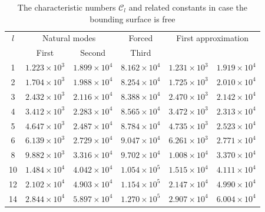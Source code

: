 \begin{table}[ht]
\centering
\caption{The characteristic numbers $\mathcal{C}_l$ and related constants in case the bounding surface is free}
\label{tab:XX}
\begin{tabular}{c c c c c c}
\hline
$l$ & \multicolumn{2}{c}{Natural modes} & Forced & \multicolumn{2}{c}{First approximation} \\
 & First & Second & Third & & \\
\hline
1 & $1.223\times 10^3$ & $1.899\times 10^4$ & $8.162\times 10^4$ & $1.231\times 10^3$ & $1.919\times 10^4$ \\
2 & $1.704\times 10^3$ & $1.988\times 10^4$ & $8.254\times 10^4$ & $1.725\times 10^3$ & $2.010\times 10^4$ \\
3 & $2.432\times 10^3$ & $2.116\times 10^4$ & $8.388\times 10^4$ & $2.470\times 10^3$ & $2.142\times 10^4$ \\
4 & $3.412\times 10^3$ & $2.283\times 10^4$ & $8.565\times 10^4$ & $3.472\times 10^3$ & $2.313\times 10^4$ \\
5 & $4.647\times 10^3$ & $2.487\times 10^4$ & $8.784\times 10^4$ & $4.735\times 10^3$ & $2.523\times 10^4$ \\
6 & $6.139\times 10^3$ & $2.729\times 10^4$ & $9.047\times 10^4$ & $6.261\times 10^3$ & $2.771\times 10^4$ \\
8 & $9.882\times 10^3$ & $3.316\times 10^4$ & $9.702\times 10^4$ & $1.008\times 10^4$ & $3.370\times 10^4$ \\
10 & $1.484\times 10^4$ & $4.042\times 10^4$ & $1.054\times 10^5$ & $1.515\times 10^4$ & $4.111\times 10^4$ \\
12 & $2.102\times 10^4$ & $4.903\times 10^4$ & $1.154\times 10^5$ & $2.147\times 10^4$ & $4.990\times 10^4$ \\
14 & $2.844\times 10^4$ & $5.897\times 10^4$ & $1.270\times 10^5$ & $2.907\times 10^4$ & $6.004\times 10^4$ \\
\hline
\end{tabular}
\end{table}

